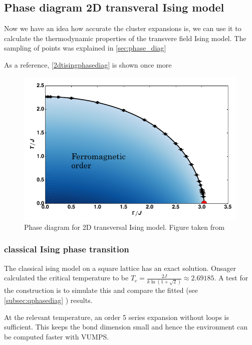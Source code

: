 \subsection{Phase diagram 2D transveral Ising model} \label{subsec:2dpahsediag}

Now we have an idea how accurate the cluster expansions is, we can use it to calculate the thermodynamic properties of the transvere field Ising model. The sampling of points was explained in \cref{sec:phase_diag}

As a reference, \cref{2dtisingphasediag} is shown once more

\begin{figure}
  \center
  \includegraphics[width=\textwidth]{Figuren/phsyics/2disingphase.png}
  \caption{Phase diagram for 2D transversal Ising model. Figure taken from \cite{Hesselmann2016}}
  \label{2dtisingphasediag2}
\end{figure}

\subsubsection{classical Ising phase transition}
The classical ising model on a square lattice has an exact solution. Onsager calculated the critical temperature to be $T_c = \frac{2 J}{k \ln(1+\sqrt{2}) } \approx 2.69185$. A test for the construction is to simulate this and compare the fitted (see \cref{subsec:qphasediag} ) results.

At the relevant temperature, an order 5 series expansion without loops is sufficient. This keeps the bond dimension small and hence the environment can be computed faster with VUMPS.

